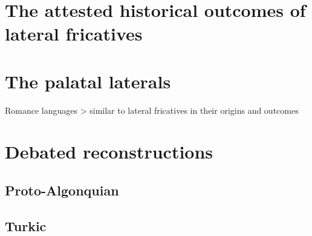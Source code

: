 \documentclass[oldfontcommands,twoside,a4paper,12pt]{article}
\begin{document}
\section{The attested historical outcomes of lateral fricatives}
\section{The palatal laterals}
Romance languages > similar to lateral fricatives in their origins and outcomes

\section{Debated reconstructions}
\subsection{Proto-Algonquian}
\citet{bloomfield25central}
\citet{bloomfield46proto}
\citet{goddard79comparative}
\cite{picard94}

\subsection{Turkic}




\end{document}

